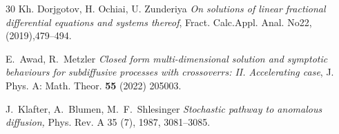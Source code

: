 \documentclass[12pt]{article}
\theoremstyle{definition}
\begin{document}
\begin{thebibliography}{30}
         Kh. Dorjgotov, H. Ochiai, U. Zunderiya \textit{On solutions of linear fractional differential equations and systems thereof}, Fract. Calc.Appl. Anal. No22,(2019),479–494.
        
        
        
        
        E.~Awad, R.~Metzler \textit{Closed form multi-dimensional solution and symptotic behaviours for subdiffusive processes with crossoverrs: II. Accelerating case}, J. Phys. A: Math. Theor. \textbf{55} (2022) 205003. 
       
        J.~Klafter, A.~Blumen, M.~F.~Shlesinger \textit{Stochastic pathway to anomalous diffusion,} Phys. Rev. A 35 (7), 1987, 3081--3085.
       
     
    


   
       
\end{thebibliography}
\end{document}
